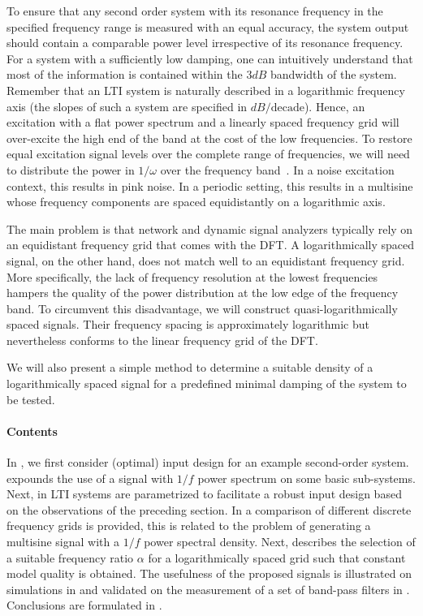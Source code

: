   To ensure that any second order system with its resonance frequency in the specified frequency range is measured with an equal accuracy, the system output should contain a comparable power level irrespective of its resonance frequency.
  For a system with a sufficiently low damping, one can intuitively understand that most of the information is contained within the $3 \unit{dB}$ bandwidth of the system.
  Remember that an \gls{LTI} system is naturally described in a logarithmic frequency axis (the slopes of such a system are specified in $\unit{dB}/\text{decade}$).
  Hence, an excitation with a flat power spectrum and a linearly spaced frequency grid will over-excite the high end of the band at the cost of the low frequencies.
  To restore equal excitation signal levels over the complete range of frequencies, we will need to distribute the power in $1/\omega$ over the frequency band~\citep{Goodwin2006,Goodwin2006GBO}.
  In a noise excitation context, this results in pink noise.
  In a periodic setting, this results in a multisine whose frequency components are spaced equidistantly on a logarithmic axis.
  
  The main problem is that network and dynamic signal analyzers typically
  rely on an equidistant frequency grid that comes with the \gls{DFT}.
  A logarithmically spaced signal, on the other hand, does not match well to an equidistant frequency grid.
  More specifically, the lack of frequency resolution at the lowest frequencies hampers the quality of the power distribution at the low edge of the frequency band.
  To circumvent this disadvantage, we will construct quasi-logarithmically spaced signals.
  Their frequency spacing is approximately logarithmic but nevertheless conforms to the linear frequency grid of the \gls{DFT}.

  We will also present a simple method to determine a suitable density of a logarithmically spaced signal for a predefined minimal damping of the system to be tested.

  \paragraph{Contents}
  In , we first consider (optimal) input design for an example second-order system.
   expounds the use of a signal with $1/f$  power spectrum on some basic sub-systems.
  Next, in  \gls{LTI} systems are parametrized to facilitate a robust input design based on the observations of the preceding section.
  In  a comparison of different discrete frequency grids is provided, this is related to the problem of generating a multisine signal with a $1/f$ power spectral density.
  Next,  describes the selection of a suitable frequency ratio $\alpha$ for a logarithmically spaced grid such that constant model quality is obtained.
  The usefulness of the proposed signals is illustrated on simulations in  and validated on the measurement of a set of band-pass filters in .
  Conclusions are formulated in .

